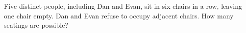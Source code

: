Five distinct people, including Dan and Evan, sit in six chairs in a row, leaving one chair empty. Dan and Evan refuse to occupy adjacent chairs. How many seatings are possible?

